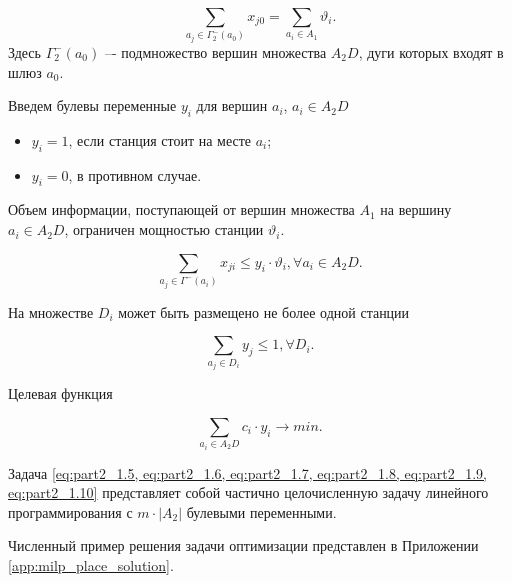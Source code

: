 \begin{equation}\label{eq:part2_1.7}
    \sum_{a_j \in \Gamma_2^-(a_0)} x_{j0} = \sum_{a_i \in A_1} \vartheta_i.
\end{equation}
Здесь $\Gamma_2^-(a_0)$ –- подмножество вершин множества $A_2D$, дуги которых входят в шлюз $a_0$.

Введем булевы переменные $y_i$ для вершин $a_i$, $a_i \in A_2D$
\begin{itemize}
    \item $y_i = 1$, если станция стоит на месте $a_i$;
    \item $y_i = 0$, в противном случае.
\end{itemize}

Объем информации, поступающей от вершин множества $A_1$ на вершину $a_i \in A_2D$, ограничен мощностью станции $\vartheta_i$.

\begin{equation}\label{eq:part2_1.8}
    \sum_{a_j \in \Gamma^-(a_i)} x_{ji} \leqslant y_i \cdot \vartheta_i, \forall a_i \in A_2D.
\end{equation}

На множестве $D_i$ может быть размещено не более одной станции 


\begin{equation}\label{eq:part2_1.9}
    \sum_{a_j \in D_i} y_j \leqslant 1, \forall D_i.
\end{equation}

Целевая функция

\begin{equation}\label{eq:part2_1.10}
    \sum_{a_i \in A_2D} c_i \cdot y_i \to min.
\end{equation}

Задача \cref{eq:part2_1.5, eq:part2_1.6, eq:part2_1.7, eq:part2_1.8, eq:part2_1.9, eq:part2_1.10} представляет собой частично целочисленную задачу линейного программирования с $m \cdot |A_2|$ булевыми переменными.

Численный пример решения задачи оптимизации представлен в Приложении \cref{app:milp_place_solution}.


